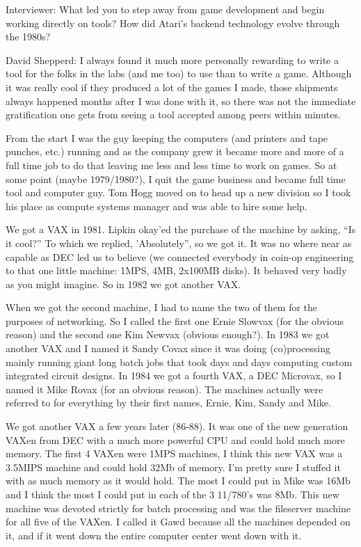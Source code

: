 \textcolor{interviewer}{Interviewer:} What led you to step away from game development and begin working directly on tools? How did Atari’s backend technology evolve through the 1980s?

\textcolor{interviewee}{David Shepperd:} I always found it much more personally rewarding to write a tool for the folks in the labs (and me too) to use than to write a game. Although it was really cool if they produced a lot of the games I made, those shipments always happened months after I was done with it, so there was not the immediate gratification one gets from seeing a tool accepted among peers within minutes. 

From the start I was the guy keeping the computers (and printers and tape punches, etc.) running and as the company grew it became more and more of a full time job to do that leaving me less and less time to work on games. So at some point (maybe 1979/1980?), I quit the game business and became full time tool and computer guy. Tom Hogg moved on to head up a new division so I took his place as compute systems manager and was able to hire some help.

We got a VAX in 1981. Lipkin okay'ed the purchase of the machine by asking, “Is it cool?” To which we replied, 'Absolutely”, so we got it. It was no where near as capable as DEC led us to believe (we connected everybody in coin-op engineering to that one little machine: 1MPS, 4MB, 2x100MB disks). It behaved very badly as you might imagine. So in 1982 we got another VAX. 

When we got the second machine, I had to name the two of them for the purposes of networking. So I called the first one Ernie Slowvax (for the obvious reason) and the second one Kim Newvax (obvious enough?). In 1983 we got another VAX and I named it Sandy Covax since it was doing (co)processing mainly running giant long batch jobs that took days and days computing custom integrated circuit designs. In 1984 we got a fourth VAX, a DEC Microvax, so I named it Mike Rovax (for an obvious reason). The machines actually were referred to for everything by their first names, Ernie, Kim, Sandy and Mike. 

We got another VAX a few years later (86-88). It was one of the new generation VAXen from DEC with a much more powerful CPU and could hold much more memory. The first 4 VAXen were 1MPS machines, I think this new VAX was a 3.5MIPS machine and could hold 32Mb of memory. I'm pretty sure I stuffed it with as much memory as it would hold. The most I could put in Mike was 16Mb and I think the most I could put in each of the 3 11/780's was 8Mb. This new machine was devoted strictly for batch processing and was the fileserver machine for all five of the VAXen. I called it Gawd because all the machines depended on it, and if it went down the entire computer center went down with it.

